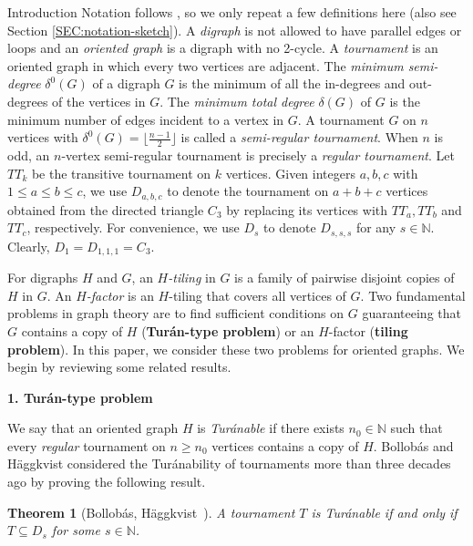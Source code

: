 \documentclass[11pt,a4paper,reqno]{amsart}
\makeatletter
\renewcommand\section{\@startsection{section}{1}%
  \z@{-1.0\linespacing\@plus-.7\linespacing}{1\linespacing}%
  {\normalfont\bfseries\large\centering}}
\newtheorem{theorem}{Theorem}[section]
\theoremstyle{definition} %
\makeatother
\begin{document}
\section{Introduction}\label{SEC-introduction}
 Notation follows \cite{bang2009}, so we only repeat a few definitions here (also see Section \ref{SEC:notation-sketch}). A \emph{digraph} is not allowed to have parallel edges or loops and an \emph{oriented graph} is a digraph with no 2-cycle. A \emph{tournament} is an oriented graph in which every two vertices are adjacent. The \emph{minimum semi-degree} $\delta^0(G)$ of a digraph $G$ is the minimum of all the in-degrees and out-degrees of the vertices in $G$.  The \emph{minimum total degree} $\delta(G)$ of $G$ is the minimum number of edges incident to a  vertex in $G$.  A tournament $G$ on $n$ vertices with $\delta^0(G) = \lfloor \frac{n-1}{2} \rfloor$ is called a \emph{semi-regular tournament}. 
When $n$ is odd, an $n$-vertex semi-regular tournament is precisely a \emph{regular tournament}. Let $TT_k$ be the transitive tournament on $k$ vertices.  Given integers $a,b,c$ with  $1\leqslant a\leqslant b\leqslant  c$, we use $D_{a,b,c}$ to denote the tournament on $a+b+c$ vertices obtained from the directed triangle $C_3$ by replacing its vertices with $TT_a, TT_b$ and $TT_c$, respectively. 
For convenience, we use $D_s$ to denote $D_{s,s,s}$ for any $s\in \mathbb{N}$. Clearly, $D_1=D_{1,1,1}=C_3$.


For digraphs $H$ and $G$, an \emph{$H$-tiling} in $G$ is a family of pairwise disjoint copies of $H$ in $G$. 
An \emph{$H$-factor} is an $H$-tiling that covers all vertices of $G$. 
Two fundamental problems in graph theory are to find sufficient conditions on $G$ guaranteeing that $G$ contains a copy of $H$ (\textbf{Tur\'an-type problem}) or an $H$-factor (\textbf{tiling problem}). 
In this paper, we consider these two problems for oriented graphs.
We begin by reviewing some related results.




\medskip

\noindent\textbf{1. Tur\'an-type problem} 
\medskip

We say that an oriented graph $H$ is \emph{Tur\'anable} if there exists $n_0 \in \mathbb{N}$ such that every \emph{regular} tournament on $n \geqslant n_0$ vertices contains a copy of $H$.  Bollob\'as and  H\"{a}ggkvist \cite{bollobasJCTB50} considered the Tur\'anability of tournaments more than three decades ago by proving the following result.

\begin{theorem}[Bollob\'as, H\"{a}ggkvist~\cite{bollobasJCTB50}] \label{THM:bollobasJCTB50}
    A tournament $T$ is Tur\'anable if and only if  $T \subseteq D_s$ for some $s \in \mathbb{N}$.
\end{theorem}
\end{document}
